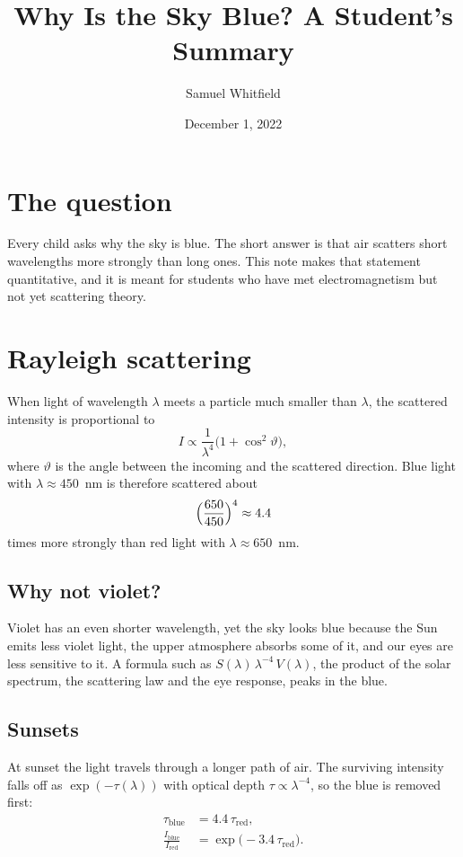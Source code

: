 \documentclass[10pt,letterpaper]{article}
\title{Why Is the Sky Blue? A Student's Summary}
\author{Samuel Whitfield}
\date{December 1, 2022}
\newcommand{\lam}{\lambda}
\begin{document}
\maketitle

\section{The question}
Every child asks why the sky is blue. The short answer is that air scatters short wavelengths more strongly than long ones. This note makes that statement quantitative, and it is meant for students who have met electromagnetism but not yet scattering theory.

\section{Rayleigh scattering}
When light of wavelength $\lam$ meets a particle much smaller than $\lam$, the scattered intensity is proportional to
\begin{equation}
  I\propto \frac{1}{\lam^{4}}\bigl(1+\cos^2\vartheta\bigr),
\end{equation}
where $\vartheta$ is the angle between the incoming and the scattered direction. Blue light with $\lam\approx 450$~nm is therefore scattered about
\[
  \Bigl(\frac{650}{450}\Bigr)^{4}\approx 4.4
\]
times more strongly than red light with $\lam\approx650$~nm.

\subsection{Why not violet?}
Violet has an even shorter wavelength, yet the sky looks blue because the Sun emits less violet light, the upper atmosphere absorbs some of it, and our eyes are less sensitive to it. A formula such as $S(\lam)\,\lam^{-4}\,V(\lam)$, the product of the solar spectrum, the scattering law and the eye response, peaks in the blue.

\subsection{Sunsets}
At sunset the light travels through a longer path of air. The surviving intensity falls off as $\exp(-\tau(\lam))$ with optical depth $\tau\propto\lam^{-4}$, so the blue is removed first:
\begin{align*}
  \tau_{\mathrm{blue}} &= 4.4\,\tau_{\mathrm{red}},\\
  \frac{I_{\mathrm{blue}}}{I_{\mathrm{red}}} &= \exp\bigl(-3.4\,\tau_{\mathrm{red}}\bigr).
\end{align*}
\end{document}
